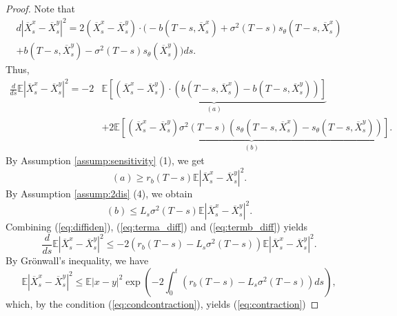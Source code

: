 \documentclass[letterpaper,10pt,reqno]{amsart}
\def\eqref#1{(\ref{#1})}
\numberwithin{equation}{section}
\begin{document}
\begin{proof}
Note that
\begin{multline*}
d|\overline{X}^x_s - \overline{X}^y_s|^2
= 2 \left(\overline{X}^x_s - \overline{X}^y_s \right)\cdot
\bigg(-b(T-s, \overline{X}^x_s) + \sigma^2(T-s) s_\theta(T-s, \overline{X}^x_s)\\
+ b(T-s, \overline{X}^y_s) - \sigma^2(T-s) s_\theta(\overline{X}^y_s)\bigg) ds.
\end{multline*}
Thus, 
\begin{equation}
\label{eq:diffiden}
\begin{aligned}
\frac{d}{ds} \mathbb{E}|\overline{X}^x_s - \overline{X}^y_s|^2
= -2 & \underbrace{\mathbb{E}\left[(\overline{X}^x_s - \overline{X}^y_s) \cdot (b(T-s, \overline{X}^x_s) - b(T-s, \overline{X}^y_s))\right]}_{(a)} \\
& + 2 \underbrace{\mathbb{E}\left[(\overline{X}^x_s - \overline{X}^y_s) \sigma^2(T-s) 
(s_\theta(T-s, \overline{X}^x_s) - s_\theta(T-s,\overline{X}^y_s))\right]}_{(b)}.
\end{aligned}
\end{equation}
By Assumption \ref{assump:sensitivity} (1),
we get
\begin{equation}
\label{eq:terma_diff}
(a) \ge  r_b(T-s) \mathbb{E}|\overline{X}^x_s - \overline{X}^y_s|^2.
\end{equation}
By Assumption \ref{assump:2dis} (4), we obtain
\begin{equation}
\label{eq:termb_diff}
(b) \le L_s \sigma^2(T-s) \mathbb{E}|\overline{X}^x_s - \overline{X}^y_s|^2.
\end{equation}
Combining \eqref{eq:diffiden}, \eqref{eq:terma_diff} 
and \eqref{eq:termb_diff} yields
\begin{equation*}
\frac{d}{ds} \mathbb{E}|\overline{X}^x_s - \overline{X}^y_s|^2 
\le -2 (r_b(T-s) - L_s \sigma^2(T-s)) \mathbb{E}|\overline{X}^x_s - \overline{X}^y_s|^2.
\end{equation*}
By Gr\"onwall's inequality, we have
\begin{equation*}
\mathbb{E}|\overline{X}^x_s - \overline{X}^y_s|^2 
\le \mathbb{E}|x - y|^2 \exp \left(-2 \int_0^t (r_b(T-s) - L_s \sigma^2(T-s)) ds  \right),
\end{equation*}
which, by the condition \eqref{eq:condcontraction}, yields \eqref{eq:contraction}
\end{proof}
\end{document}
